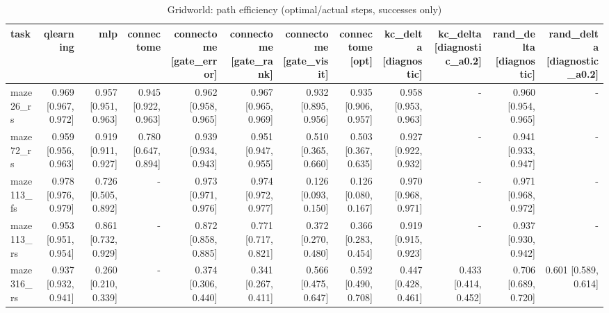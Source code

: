 \begin{table}[t]
\centering
\small
\begin{tabular}{lrrrrrrrrrrr}
\toprule
task & qlearning & mlp & connectome & connectome [gate\_error] & connectome [gate\_rank] & connectome [gate\_visit] & connectome [opt] & kc\_delta [diagnostic] & kc\_delta [diagnostic\_a0.2] & rand\_delta [diagnostic] & rand\_delta [diagnostic\_a0.2] \\
\midrule
maze26\_rs & 0.969 [0.967, 0.972] & 0.957 [0.951, 0.963] & 0.945 [0.922, 0.963] & 0.962 [0.958, 0.965] & 0.967 [0.965, 0.969] & 0.932 [0.895, 0.956] & 0.935 [0.906, 0.957] & 0.958 [0.953, 0.963] & - & 0.960 [0.954, 0.965] & - \\
maze72\_rs & 0.959 [0.956, 0.963] & 0.919 [0.911, 0.927] & 0.780 [0.647, 0.894] & 0.939 [0.934, 0.943] & 0.951 [0.947, 0.955] & 0.510 [0.365, 0.660] & 0.503 [0.367, 0.635] & 0.927 [0.922, 0.932] & - & 0.941 [0.933, 0.947] & - \\
maze113\_fs & 0.978 [0.976, 0.979] & 0.726 [0.505, 0.892] & - & 0.973 [0.971, 0.976] & 0.974 [0.972, 0.977] & 0.126 [0.093, 0.150] & 0.126 [0.080, 0.167] & 0.970 [0.968, 0.971] & - & 0.971 [0.968, 0.972] & - \\
maze113\_rs & 0.953 [0.951, 0.954] & 0.861 [0.732, 0.929] & - & 0.872 [0.858, 0.885] & 0.771 [0.717, 0.821] & 0.372 [0.270, 0.480] & 0.366 [0.283, 0.454] & 0.919 [0.915, 0.923] & - & 0.937 [0.930, 0.942] & - \\
maze316\_rs & 0.937 [0.932, 0.941] & 0.260 [0.210, 0.339] & - & 0.374 [0.306, 0.440] & 0.341 [0.267, 0.411] & 0.566 [0.475, 0.647] & 0.592 [0.490, 0.708] & 0.447 [0.428, 0.461] & 0.433 [0.414, 0.452] & 0.706 [0.689, 0.720] & 0.601 [0.589, 0.614] \\
\bottomrule
\end{tabular}
\caption{Gridworld: path efficiency (optimal/actual steps, successes only)}
\label{tab:gridworld_path_efficiency}
\end{table}